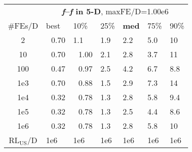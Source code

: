 \begin{tabular}{c|llllll}
 & \multicolumn{6}{|c}{\textbf{\textit{f}\raisebox{-0.35ex}{1}--\textit{f}\raisebox{-0.35ex}{24} in 5-D}, maxFE/D=1.00e6}\\
\#FEs/D & best & 10\% & 25\% & \textbf{med} & 75\% & 90\%\\
2 & ~\,0.70 & \hspace*{1ex}1.1 & \hspace*{1ex}1.9 & \hspace*{1ex}2.2 & \hspace*{1ex}5.0 & 10\\
10 & ~\,0.70 & ~\,1.00 & \hspace*{1ex}2.1 & \hspace*{1ex}2.8 & \hspace*{1ex}3.7 & 11\\
100 & ~\,0.47 & ~\,0.97 & \hspace*{1ex}2.5 & \hspace*{1ex}4.2 & \hspace*{1ex}6.7 & \hspace*{1ex}8.8\\
1e3 & ~\,0.70 & ~\,0.88 & \hspace*{1ex}1.5 & \hspace*{1ex}2.9 & \hspace*{1ex}7.3 & 14\\
1e4 & ~\,0.32 & ~\,0.78 & \hspace*{1ex}1.3 & \hspace*{1ex}2.8 & \hspace*{1ex}5.8 & \hspace*{1ex}9.4\\
1e5 & ~\,0.32 & ~\,0.78 & \hspace*{1ex}1.3 & \hspace*{1ex}2.5 & \hspace*{1ex}4.4 & \hspace*{1ex}8.6\\
1e6 & ~\,0.32 & ~\,0.78 & \hspace*{1ex}1.3 & \hspace*{1ex}2.8 & \hspace*{1ex}5.8 & 10\\
$\text{RL}_{\text{US}}$/D & 1e6 & 1e6 & 1e6 & 1e6 & 1e6 & 1e6
\end{tabular}
